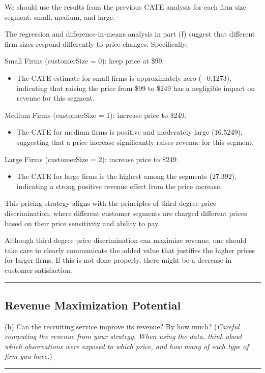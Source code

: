 \documentclass{article}
\newenvironment{colorparagraph}[1]{\par\color{#1}}{\par}
\begin{document}
We should use the results from the previous CATE analysis for each firm size segment: small, medium, and large.

The regression and difference-in-means analysis in part (f) suggest that different firm sizes respond differently to price changes. Specifically:

Small Firms (customerSize = 0): keep price at \$99.
\begin{itemize}
    \item The CATE estimate for small firms is approximately zero (\(-0.1273\)), indicating that raising the price from \$99 to \$249 has a negligible impact on revenue for this segment.
\end{itemize}

Medium Firms (customerSize = 1): increase price to \$249.
\begin{itemize}
    \item The CATE for medium firms is positive and moderately large (\(16.5249\)), suggesting that a price increase significantly raises revenue for this segment.
\end{itemize}

Large Firms (customerSize = 2): increase price to \$249.
\begin{itemize}
    \item The CATE for large firms is the highest among the segments (\(27.392\)), indicating a strong positive revenue effect from the price increase.
\end{itemize}

This pricing strategy aligns with the principles of third-degree price discrimination, where different customer segments are charged different prices based on their price sensitivity and ability to pay.

Although third-degree price discrimination can maximize revenue, one should take care to clearly communicate the added value that justifies the higher prices for larger firms. If this is not done properly, there might be a decrease in customer satisfaction.

\begin{colorparagraph}{questioncolor}
\rule{\textwidth}{0.5pt}

\label{q3h}\subsection{Revenue Maximization Potential}
(h) Can the recruiting service improve its revenue? By how much? (\textit{Careful computing the revenue from your strategy. When using the data, think about which observations were exposed to which price, and how many of each type of firm you have.})

\rule{\textwidth}{0.5pt}
\end{colorparagraph}
\end{document}
